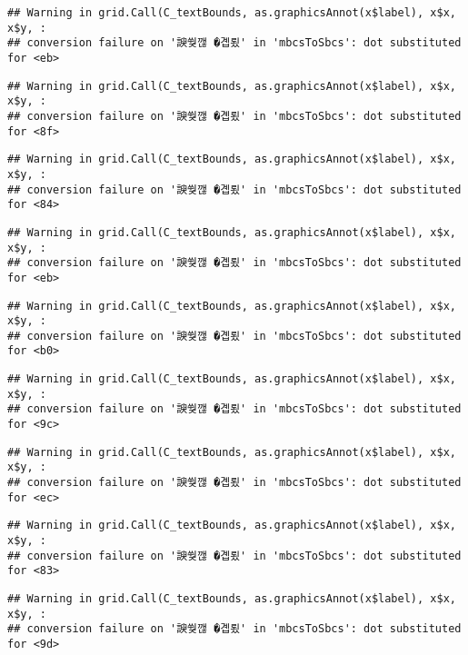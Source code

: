 \documentclass[
]{article}
\begin{document}
\begin{verbatim}
## Warning in grid.Call(C_textBounds, as.graphicsAnnot(x$label), x$x, x$y, :
## conversion failure on '諛쒖깮 �곕룄' in 'mbcsToSbcs': dot substituted for <eb>
\end{verbatim}

\begin{verbatim}
## Warning in grid.Call(C_textBounds, as.graphicsAnnot(x$label), x$x, x$y, :
## conversion failure on '諛쒖깮 �곕룄' in 'mbcsToSbcs': dot substituted for <8f>
\end{verbatim}

\begin{verbatim}
## Warning in grid.Call(C_textBounds, as.graphicsAnnot(x$label), x$x, x$y, :
## conversion failure on '諛쒖깮 �곕룄' in 'mbcsToSbcs': dot substituted for <84>
\end{verbatim}

\begin{verbatim}
## Warning in grid.Call(C_textBounds, as.graphicsAnnot(x$label), x$x, x$y, :
## conversion failure on '諛쒖깮 �곕룄' in 'mbcsToSbcs': dot substituted for <eb>
\end{verbatim}

\begin{verbatim}
## Warning in grid.Call(C_textBounds, as.graphicsAnnot(x$label), x$x, x$y, :
## conversion failure on '諛쒖깮 �곕룄' in 'mbcsToSbcs': dot substituted for <b0>
\end{verbatim}

\begin{verbatim}
## Warning in grid.Call(C_textBounds, as.graphicsAnnot(x$label), x$x, x$y, :
## conversion failure on '諛쒖깮 �곕룄' in 'mbcsToSbcs': dot substituted for <9c>
\end{verbatim}

\begin{verbatim}
## Warning in grid.Call(C_textBounds, as.graphicsAnnot(x$label), x$x, x$y, :
## conversion failure on '諛쒖깮 �곕룄' in 'mbcsToSbcs': dot substituted for <ec>
\end{verbatim}

\begin{verbatim}
## Warning in grid.Call(C_textBounds, as.graphicsAnnot(x$label), x$x, x$y, :
## conversion failure on '諛쒖깮 �곕룄' in 'mbcsToSbcs': dot substituted for <83>
\end{verbatim}

\begin{verbatim}
## Warning in grid.Call(C_textBounds, as.graphicsAnnot(x$label), x$x, x$y, :
## conversion failure on '諛쒖깮 �곕룄' in 'mbcsToSbcs': dot substituted for <9d>
\end{verbatim}
\end{document}
